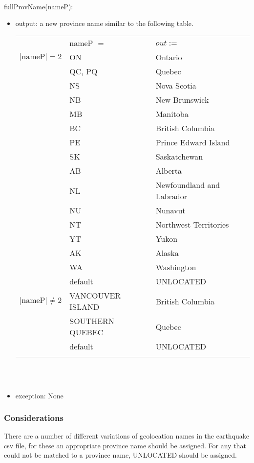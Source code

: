 \documentclass[12pt]{article}
\begin{document}
\noindent fullProvName(nameP):
\begin{itemize}
\item output: a new province name similar to the following table.

\begin{tabular}{|p{3cm}|p{3.5cm}|l|}
\hhline{~|-|-|}
\multicolumn{1}{l|}{} & nameP $=$ & \multicolumn{1}{l|}{$out :=$}\\
\hhline{|-|-|-|}
$|\mbox{nameP}| = 2$ & ON & Ontario\\
\hhline{|~|-|-|}
 & QC, PQ & Quebec\\
\hhline{|~|-|-|}
 & NS & Nova Scotia\\
\hhline{|~|-|-|}
 & NB & New Brunswick\\
\hhline{|~|-|-|}
 & MB & Manitoba\\
\hhline{|~|-|-|}
 & BC & British Columbia\\
\hhline{|~|-|-|}
 & PE & Prince Edward Island\\
\hhline{|~|-|-|}
 & SK & Saskatchewan\\
\hhline{|~|-|-|}
 & AB & Alberta\\
\hhline{|~|-|-|}
 & NL & Newfoundland and Labrador\\
\hhline{|~|-|-|}
 & NU & Nunavut\\
\hhline{|~|-|-|}
 & NT & Northwest Territories\\
\hhline{|~|-|-|}
 & YT & Yukon\\
\hhline{|~|-|-|}
 & AK & Alaska\\
\hhline{|~|-|-|}
 & WA & Washington\\
\hhline{|~|-|-|}
 & default & UNLOCATED\\
\hhline{|-|-|-|}
$|\mbox{nameP}| \neq 2$ & VANCOUVER ISLAND & British Columbia\\
\hhline{|~|-|-|}
& SOUTHERN QUEBEC & Quebec\\
\hhline{|~|-|-|}
& default & UNLOCATED\\
\hhline{|-|-|-|}
\end{tabular}\\\\

\item exception: None
\end{itemize}

\subsubsection* {Considerations}

There are a number of different variations of geolocation names in the earthquake csv file, for these an appropriate province name
should be assigned. For any that could not be matched to a province name, UNLOCATED should be assigned.\\
\end{document}
